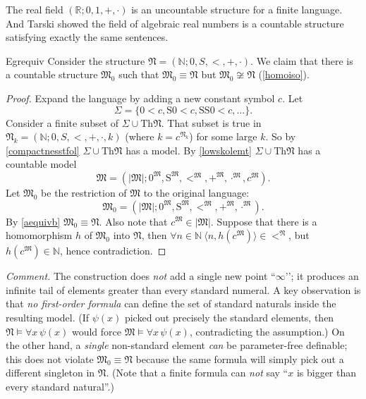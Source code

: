 The real field $(\mathbb{R};0,1,+,\cdot)$ is an uncountable structure for a finite language. And Tarski showed the field of algebraic real numbers is a countable structure satisfying exactly the same sentences.

\begin{reference}{Eg}{requiv}
  Consider the structure $\mathfrak{N}=(\mathbb{N};0,S,<,+,\cdot).$ We claim that there is a countable structure $\mathfrak{M}_0$ such that $\mathfrak{M}_0\equiv \mathfrak{N}$ but $\mathfrak{M}_0\not\cong \mathfrak{N}$ (\ref{homoiso}).
\end{reference}

\begin{proof}
  Expand the language by adding a new constant symbol $c$. Let
  \[
    \Sigma=\{0<c,\mathrm{S}0<c,\mathrm{SS}0<c,\dots\}.
  \]
  Consider a finite subset of $\Sigma\cup \mathrm{Th}\mathfrak{N}$. That subset is true in $\mathfrak{N}_k=(\mathbb{N};0,S,<,+,\cdot,k)$ (where $k=c^{\mathfrak{N}_k}$) for some large $k$. So by \ref{compactnesstfol} $\Sigma\cup \mathrm{Th}\mathfrak{N}$ has a model. By \ref{lowskolemt} $\Sigma\cup \mathrm{Th}\mathfrak{N}$ has a countable model
  \[
    \mathfrak{M}=(|\mathfrak{M}|;0^{\mathfrak{M}},\mathrm{S}^{\mathfrak{M}}, <^{\mathfrak{M}}, +^{\mathfrak{M}}, \cdot^{\mathfrak{M}}, c^{\mathfrak{M}}).
  \]
  Let $\mathfrak{M}_0$ be the restriction of $\mathfrak{M}$ to the original language:
  \[
    \mathfrak{M}_0=(|\mathfrak{M}|;0^{\mathfrak{M}},\mathrm{S}^{\mathfrak{M}}, <^{\mathfrak{M}}, +^{\mathfrak{M}}, \cdot^{\mathfrak{M}}).
  \]
  By \ref{aequivb} $\mathfrak{M}_0\equiv \mathfrak{N}$. Also note that $c^{\mathfrak{M}}\in|\mathfrak{M}|$. Suppose that there is a homomorphism $h$ of $\mathfrak{M}_0$ into $\mathfrak{N}$, then $\forall n\in \mathbb{N}\ \langle n,h(c^{\mathfrak{M}})\rangle\in <^\mathfrak{N}$, but $h(c^{\mathfrak{M}})\in \mathbb{N}$, hence contradiction.
\end{proof}

\textit{Comment.}
The construction does \emph{not} add a single new point ``$\infty$’’; it produces an infinite tail of elements greater than every standard numeral.
A key observation is that \emph{no first-order formula} can define the set of standard naturals inside the resulting model.
(If $\psi(x)$ picked out precisely the standard elements, then $\mathfrak N\models\forall x\,\psi(x)$ would force $\mathfrak M\models\forall x\,\psi(x)$, contradicting the assumption.)
On the other hand, a \emph{single} non-standard element \emph{can} be parameter-free definable; this does not violate $\mathfrak M_0\equiv\mathfrak N$ because the same formula will simply pick out a different singleton in $\mathfrak N$.
(Note that a finite formula can \textit{not} say ``$x$ is bigger than every standard natural''.)

